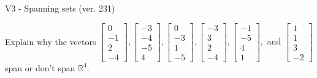 \begin{exercise}
  \begin{exerciseTitle}V3 - Spanning sets (ver. 231)\end{exerciseTitle}
  \begin{exerciseStatement}
    Explain why the vectors \(\left[\begin{array}{r}
0 \\
-1 \\
2 \\
-4
\end{array}\right] , \left[\begin{array}{r}
-3 \\
-4 \\
-5 \\
4
\end{array}\right] , \left[\begin{array}{r}
0 \\
-3 \\
1 \\
-5
\end{array}\right] , \left[\begin{array}{r}
-3 \\
3 \\
2 \\
-4
\end{array}\right] , \left[\begin{array}{r}
-1 \\
-5 \\
4 \\
1
\end{array}\right] , \text{ and } \left[\begin{array}{r}
1 \\
1 \\
3 \\
-2
\end{array}\right]\) span or don't span \(\mathbb{R}^4\). 
	



\end{exerciseStatement}
\end{exercise}
